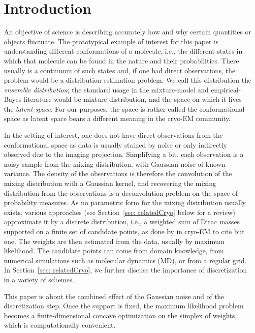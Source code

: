 \documentclass[12pt]{iopart}
\theoremstyle{remark}
\begin{document}
\section{Introduction}

An objective of science is describing accurately how and why certain
quantities or objects fluctuate. The prototypical example of interest for
this paper is understanding different conformations of a molecule, i.e., the
different states in which that molecule can be found in the nature and their probabilities. There
usually is a continuum of such states and, if one had direct observations,
the problem would be a distribution-estimation problem. We call this
distribution the \emph{ensemble distribution};  the standard usage in the
mixture-model and empirical-Bayes literature would be mixture distribution, and the space on which it
lives the \emph{latent space}.  For our purposes, the space is rather called the conformational space as latent space bears a different meaning in the cryo-EM community.


In the setting of interest, one does not have direct observations from the conformational space as  data is usually stained by noise or only indirectly
observed due to the imaging projection. Simplifying a bit, each observation is a noisy sample
from the mixing distribution, with Gaussian noise of known variance. The
density of the observations is therefore the convolution of the mixing
distribution with a Gaussian kernel, and recovering the mixing distribution
from the observations is a deconvolution problem on the space of probability
measures. As no parametric form for the mixing distribution usually exists,
various approaches (see Section~\ref{sec: relatedCryo} below for a review) approximate it by a discrete distribution, i.e., a weighted
sum of Dirac masses supported on a finite set of candidate points, as done by \citet{tang2023ensemble} in cryo-EM to cite but one.   The
weights are then estimated from the data, usually by maximum likelihood.
The candidate points can come from domain knowledge, from numerical
simulations such as molecular dynamics (MD), or from a regular grid. In Section~\ref{sec: relatedCryo}, we further discuss the importance of discretization in a variety of schemes. 



This paper is about the combined effect of the Gaussian noise and of the
discretization step. Once the support is fixed, the maximum likelihood
problem becomes a finite-dimensional concave optimization on the simplex of
weights, which is computationally convenient.
\end{document}
